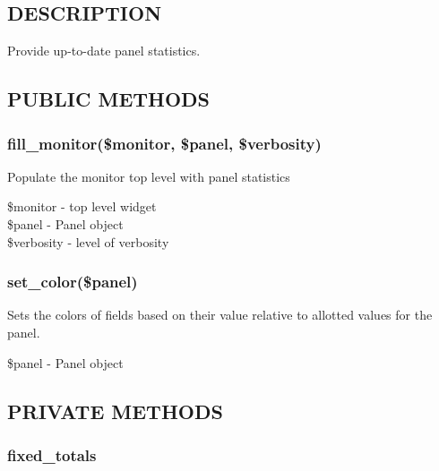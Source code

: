 \documentclass{article}
\begin{document}
\subsection*{DESCRIPTION\label{Monitor_DESCRIPTION}}


Provide up-to-date panel statistics.

\subsection*{PUBLIC METHODS\label{Monitor_PUBLIC_METHODS}}
\subsubsection*{fill\_monitor(\$monitor, \$panel, \$verbosity)\label{Monitor_fill_monitor_monitor_panel_verbosity_}}


Populate the monitor top level with panel statistics

\begin{description}

\item[{\$monitor - top level widget}] \mbox{}
\item[{\$panel - Panel object}] \mbox{}
\item[{\$verbosity - level of verbosity}] \mbox{}\end{description}
\subsubsection*{set\_color(\$panel)\label{Monitor_set_color_panel_}}


Sets the colors of fields based on their value relative to allotted values for
the panel.

\begin{description}

\item[{\$panel - Panel object}] \mbox{}\end{description}
\subsection*{PRIVATE METHODS\label{Monitor_PRIVATE_METHODS}}
\subsubsection*{fixed\_totals\label{Monitor_fixed_totals}}
\end{document}
